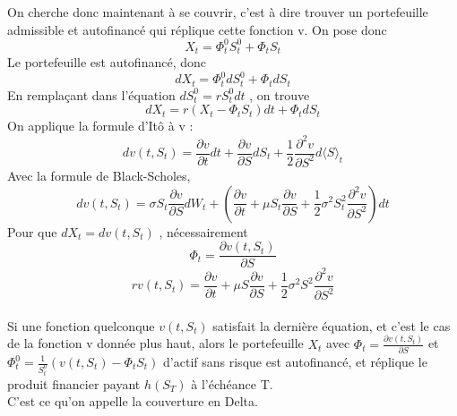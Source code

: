 \documentclass[french,12pt,a4paper]{article}
\begin{document}
\\ \\
On cherche donc maintenant à se couvrir, c'est à dire trouver un portefeuille admissible et autofinancé qui réplique cette fonction v. On pose donc
$$ X_t = \Phi_{t}^0 S_{t}^0  + \Phi_t S_{t}  $$
Le portefeuille est autofinancé, donc
$$ dX_t = \Phi_{t}^0 dS_{t}^0  + \Phi_t dS_{t} $$
En remplaçant dans l'équation $ dS_{t}^0 = r S_{t}^0 dt $ , on trouve
$$ dX_t = r(X_t - \Phi_t S_{t} )dt + \Phi_t dS_{t}  $$
On applique la formule d'Itô à v :
$$ dv(t,S_t) = \frac{\partial v}{\partial t}dt + \frac{\partial v}{\partial S}dS_t + \frac{1}{2} \frac{\partial^2 v}{\partial S^2} d \langle S \rangle_t   $$
Avec la formule de Black-Scholes,
$$ dv(t,S_t) = \sigma S_t \frac{\partial v}{\partial S} dW_t + \left (  \frac{\partial v}{\partial t} + \mu S_t   \frac{\partial v}{\partial S} +  \frac{1}{2} \sigma^2 S_{t}^2 \frac{\partial^2 v}{\partial S^2} \right ) dt	$$
Pour que $ dX_t = dv(t,S_t) $ , nécessairement
$$ \Phi_t = \frac{\partial v(t,S_t)}{\partial S} $$
$$ rv(t,S_t) = \frac{\partial v}{\partial t} + \mu S  \frac{\partial v}{\partial S} +  \frac{1}{2} \sigma^2 S^2 \frac{\partial^2 v}{\partial S^2} $$ \\
Si une fonction quelconque $ v(t,S_t) $ satisfait la dernière équation, et c'est le cas de la fonction v donnée plus haut, alors le portefeuille $ X_t $ avec $ \Phi_t = \frac{\partial v(t,S_t)}{\partial S} $ et $ \Phi_{t}^0  = \frac{1}{S_{t}^0} (v(t,S_t) - \Phi_t S_t )$ d'actif sans risque est autofinancé, et réplique le produit financier payant $ h(S_T) $ à l'échéance T.  \\
C'est ce qu'on appelle la couverture en Delta.
\end{document}
